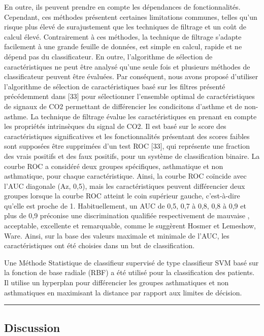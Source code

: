 \documentclass[12pt,]{article}
\begin{document}
En outre, ils peuvent prendre en compte les dépendances de
fonctionnalités. Cependant, ces méthodes présentent certaines
limitations communes, telles qu'un risque plus élevé de surajustement
que les techniques de filtrage et un coût de calcul élevé. Contrairement
à ces méthodes, la technique de filtrage s'adapte facilement à une
grande feuille de données, est simple en calcul, rapide et ne dépend pas
du classificateur. En outre, l'algorithme de sélection de
caractéristiques ne peut être analysé qu'une seule fois et plusieurs
méthodes de classificateur peuvent être évaluées. Par conséquent, nous
avons proposé d'utiliser l'algorithme de sélection de caractéristiques
basé sur les filtres présenté précédemment dans {[}33{]} pour
sélectionner l'ensemble optimal de caractéristiques de signaux de CO2
permettant de différencier les condicitons d'asthme et de non-asthme. La
technique de filtrage évalue les caractéristiques en prenant en compte
les propriétés intrinsèques du signal de CO2. Il est basé sur le score
des caractéristiques significatives et les fonctionnalités présentant
des scores faibles sont supposées être supprimées d'un test ROC
{[}33{]}, qui représente une fraction des vrais positifs et des faux
positifs, pour un système de classification binaire. La courbe ROC a
considéré deux groupes spécifiques, asthmatique et non asthmatique, pour
chaque caractéristique. Ainsi, la courbe ROC coïncide avec l'AUC
diagonale (Az, 0,5), mais les caractéristiques peuvent différencier deux
groupes lorsque la courbe ROC atteint le coin supérieur gauche,
c'est-à-dire qu'elle est proche de 1. Habituellement, un AUC de 0,5, 0,7
à 0,8, 0,8 à 0,9 et plus de 0,9 préconise une discrimination qualifiée
respectivement de mauvaise , acceptable, excellente et remarquable,
comme le suggèrent Hosmer et Lemeshow, Ware. Ainsi, sur la base des
valeurs maximale et minimale de l'AUC, les caractéristiques ont été
choisies dans un but de classification.

Une Méthode Statistique de classifieur supervisé de type classifieur SVM
basé sur la fonction de base radiale (RBF) a été utilisé pour la
classification des patients. Il utilise un hyperplan pour différencier
les groupes asthmatiques et non asthmatiques en maximisant la distance
par rapport aux limites de décision.

\begin{center}\rule{0.5\linewidth}{\linethickness}\end{center}

\hypertarget{discussion}{%
\subsection{Discussion}\label{discussion}}
\end{document}
